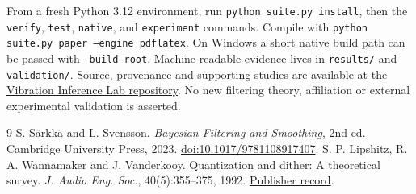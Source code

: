 \documentclass[10pt,a4paper]{article}
\begin{document}
From a fresh Python 3.12 environment, run \texttt{python suite.py install}, then the \texttt{verify}, \texttt{test}, \texttt{native}, and \texttt{experiment} commands. Compile with \texttt{python suite.py paper --engine pdflatex}. On Windows a short native build path can be passed with \texttt{--build-root}. Machine-readable evidence lives in \texttt{results/} and \texttt{validation/}. Source, provenance and supporting studies are available at \href{https://github.com/racostacme-come/vibration-inference-lab}{the Vibration Inference Lab repository}. No new filtering theory, affiliation or external experimental validation is asserted.
\begin{thebibliography}{9}
 S. S\"arkk\"a and L. Svensson. \emph{Bayesian Filtering and Smoothing}, 2nd ed. Cambridge University Press, 2023. \href{https://doi.org/10.1017/9781108917407}{doi:10.1017/9781108917407}.
 S. P. Lipshitz, R. A. Wannamaker and J. Vanderkooy. Quantization and dither: A theoretical survey. \emph{J. Audio Eng. Soc.}, 40(5):355--375, 1992. \href{https://aes.org/publications/elibrary/elibrary-page/?id=7047}{Publisher record}.
\end{thebibliography}
\end{document}
